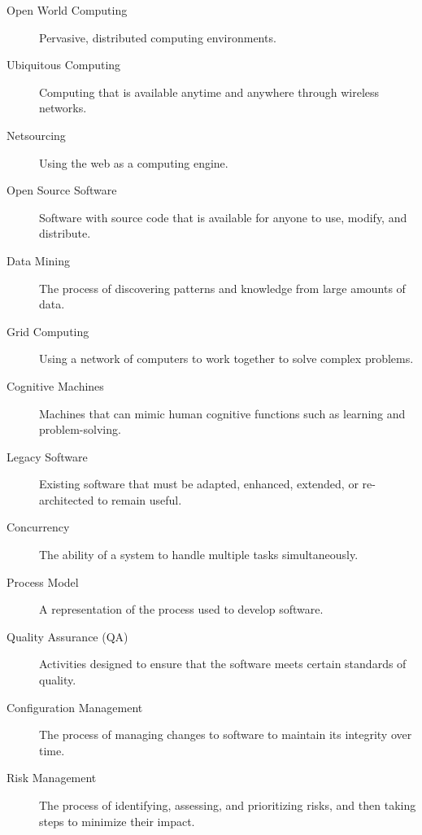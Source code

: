\documentclass{article}
\begin{document}
\begin{description}
  \item[Open World Computing] Pervasive, distributed computing environments.
  
  \item[Ubiquitous Computing] Computing that is available anytime and anywhere through wireless networks.
  
  \item[Netsourcing] Using the web as a computing engine.
  
  \item[Open Source Software] Software with source code that is available for anyone to use, modify, and distribute.
  
  \item[Data Mining] The process of discovering patterns and knowledge from large amounts of data.
  
  \item[Grid Computing] Using a network of computers to work together to solve complex problems.
  
  \item[Cognitive Machines] Machines that can mimic human cognitive functions such as learning and problem-solving.
  
  \item[Legacy Software] Existing software that must be adapted, enhanced, extended, or re-architected to remain useful.
  
  \item[Concurrency] The ability of a system to handle multiple tasks simultaneously.
  
  \item[Process Model] A representation of the process used to develop software.
  
  \item[Quality Assurance (QA)] Activities designed to ensure that the software meets certain standards of quality.
  
  \item[Configuration Management] The process of managing changes to software to maintain its integrity over time.
  
  \item[Risk Management] The process of identifying, assessing, and prioritizing risks, and then taking steps to minimize their impact.
\end{description}
\end{document}
